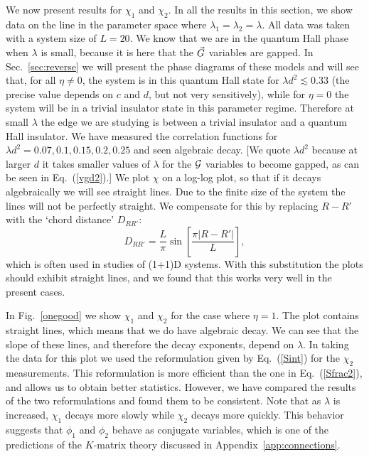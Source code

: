 We now present results for $\chi_1$ and $\chi_2$. In all the results in this section, we show data on the line in the parameter space where $\lambda_1=\lambda_2=\lambda$. All data was taken with a system size of $L=20$.  We know that we are in the quantum Hall phase when $\lambda$ is small, because it is here that the $\vec{G}$ variables are gapped. In Sec.~\ref{sec:reverse} we will present the phase diagrams of these models and will see that, for all $\eta \neq 0$, the system is in this quantum Hall state for $\lambda d^2\lesssim 0.33$ (the precise value depends on $c$ and $d$, but not very sensitively), while for $\eta=0$ the system will be in a trivial insulator state in this parameter regime.  Therefore at small $\lambda$ the edge we are studying is between a trivial insulator and a quantum Hall insulator. We have measured the correlation functions for $\lambda d^2=0.07,0.1,0.15,0.2,0.25$ and seen algebraic decay.  [We quote $\lambda d^2$ because at larger $d$ it takes smaller values of $\lambda$ for the $\cal{G}$ variables to become gapped, as can be seen in Eq.~(\ref{vgd2}).]  We plot $\chi$ on a log-log plot, so that if it decays algebraically we will see straight lines.  Due to the finite size of the system the lines will not be perfectly straight. We compensate for this by replacing $R-R'$ with the `chord distance' $D_{RR'}$:
\begin{equation}
D_{RR'}=\frac{L}{\pi}\sin\left[\frac{\pi |R-R'|}{L}\right],
\label{cordlength}
\end{equation}
which is often used in studies of (1+1)D systems.
With this substitution the plots should exhibit straight lines, and we found that this works very well in the present cases.

In Fig.~\ref{onegood} we show $\chi_1$ and $\chi_2$ for the case where $\eta=1$. The plot contains straight lines, which means that we do have algebraic decay. We can see that the slope of these lines, and therefore the decay exponents, depend on $\lambda$. In taking the data for this plot we used the reformulation given by Eq.~(\ref{Sint}) for the $\chi_2$ measurements. This reformulation is more efficient than the one in Eq.~(\ref{Sfrac2}), and allows us to obtain better statistics. However, we have compared the results of the two reformulations and found them to be consistent. Note that as $\lambda$ is increased, $\chi_1$ decays more slowly while $\chi_2$ decays more quickly. This behavior suggests that $\phi_1$ and $\phi_2$ behave as conjugate variables, which is one of the predictions of the $K$-matrix theory discussed in Appendix~\ref{app:connections}.

